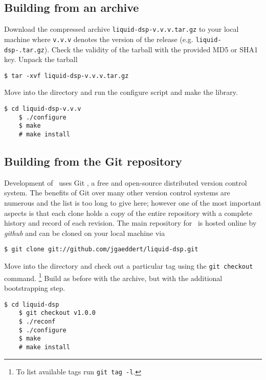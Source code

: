 \subsection{Building from an archive}
\label{section:installation:build_from_tarball}
Download the compressed archive {\tt liquid-dsp-v.v.v.tar.gz} to your
local machine where {\tt v.v.v} denotes the version of the release
(e.g. {\tt liquid-dsp-\liquidversion.tar.gz}).
Check the validity of the tarball with the provided MD5 or SHA1 key.
%
%
%
%
Unpack the tarball
%
\begin{Verbatim}[fontsize=\small]
    $ tar -xvf liquid-dsp-v.v.v.tar.gz
\end{Verbatim}
%
Move into the directory and run the configure script and make the
library.
%
\begin{Verbatim}[fontsize=\small]
    $ cd liquid-dsp-v.v.v
    $ ./configure
    $ make
    # make install
\end{Verbatim}

\subsection{Building from the Git repository}
\label{section:installation:build_from_git}
Development of \liquid\ uses Git \cite{git:web}, a free and
open-source distributed version control system.
The benefits of Git over many other version control systems are
numerous and the list is too long to give here;
however one of the most important aspects is that each clone holds a
copy of the entire repository with a complete history and record of each
revision.
The main repository for \liquid\ is hosted online by {\em github}
\cite{github:web} and can be cloned on your local machine via
%
\begin{Verbatim}[fontsize=\small]
    $ git clone git://github.com/jgaeddert/liquid-dsp.git
\end{Verbatim}
%
Move into the directory and check out a particular tag using the
{\tt git checkout} command.%
\footnote{To list available tags run {\tt git tag -l}.}
Build as before with the archive, but with the additional bootstrapping
step.
%
\begin{Verbatim}[fontsize=\small]
    $ cd liquid-dsp
    $ git checkout v1.0.0
    $ ./reconf
    $ ./configure
    $ make
    # make install
\end{Verbatim}
%

